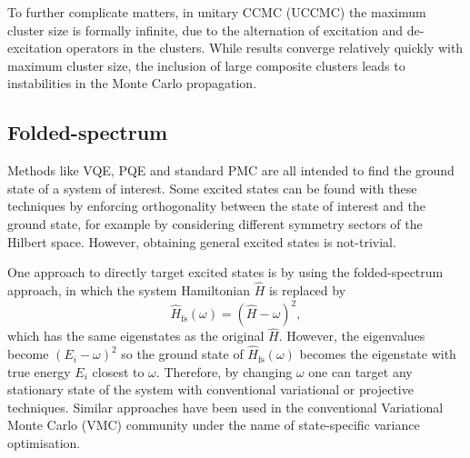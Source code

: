 \documentclass[%
 reprint,
 amsmath,amssymb,
 aps,
]{revtex4-2}
\begin{document}
To further complicate matters, in unitary CCMC (UCCMC)\cite{Filip2020} the maximum cluster size is formally infinite, due to the alternation of excitation and de-excitation operators in the clusters. While results converge relatively quickly with maximum cluster size, the inclusion of large composite clusters leads to instabilities in the Monte Carlo propagation.


\subsection{Folded-spectrum} 
Methods like VQE, PQE and standard PMC are all intended to find the ground state of a system of interest. Some excited states can be found with these techniques by enforcing orthogonality between the state of interest and the ground state, for example by considering different symmetry sectors of the Hilbert space.\cite{Nakanishi2019} However, obtaining general excited states is not-trivial.

One approach to directly target excited states is by using the folded-spectrum approach,\cite{Peruzzo2014,Cao2019,CadiTazi2023} in which the system Hamiltonian $\hat H$ is replaced by
\begin{equation}
\hat H_\mathrm{fs} (\omega) =  (\hat H - \omega)^2,
\label{eq:fs_ham}
\end{equation}
which has the same eigenstates as the original $\hat H$. However, the eigenvalues become $(E_i - \omega)^2$ so the ground state of $\hat H_\mathrm{fs}(\omega)$ becomes the eigenstate with true energy $E_i$ closest to $\omega$. Therefore, by changing $\omega$ one can target any stationary state of the system with conventional variational or projective techniques. Similar approaches have been used in the conventional Variational Monte Carlo (VMC) community under the name of state-specific variance optimisation.\cite{Umrigar1988, Zhao2016,Shea2017,Cuzzocrea2020, Otis2023}
\end{document}
